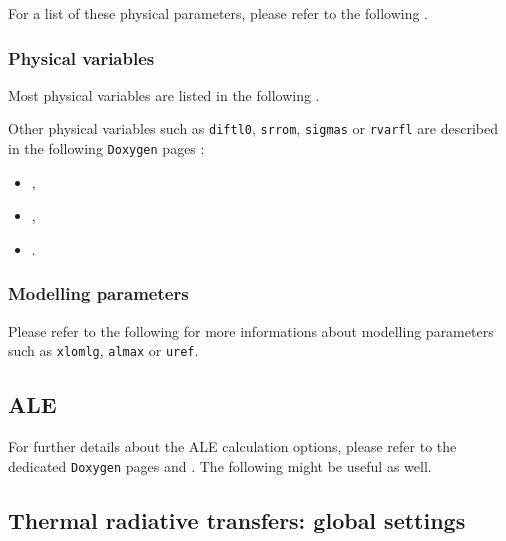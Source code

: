 For a list of these physical parameters, please refer to the following
.

\subsubsection{Physical variables}

Most physical variables are listed in the following
.

Other physical variables such as \texttt{diftl0}, \texttt{srrom},
\texttt{sigmas} or \texttt{rvarfl} are described in the following
\texttt{Doxygen} pages :
\begin{itemize}
\item {},
\item {},
\item {}.
\end{itemize}

\subsubsection{Modelling parameters}

Please refer to the following
 for
more informations about modelling parameters such as \texttt{xlomlg},
\texttt{almax} or \texttt{uref}.

\subsection{ALE}

For further details about the ALE calculation options,
please refer to the dedicated \texttt{Doxygen} pages
 and
. The following
 might be useful as well.

\subsection{Thermal radiative transfers: global settings}

